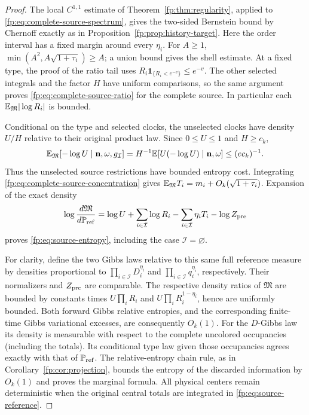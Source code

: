 \begin{proof}
The local $C^{1,1}$ estimate of Theorem~\ref{fp:thm:regularity},
applied to \eqref{fp:eq:complete-source-spectrum}, gives the
two-sided Bernstein bound by Chernoff exactly as in
Proposition~\ref{fp:prop:history-target}. Here the order interval
has a fixed margin around every $\eta_i$. For $A\ge1$,
$\min(A^2,A\sqrt{1+\tau_i})\ge A$; a union bound gives the shell
estimate. At a fixed type, the proof of the ratio tail uses
$R_i\mathbf1_{\{R_i<e^{-v}\}}\le e^{-v}$. The other selected
integrals and the factor $H$ have uniform comparisons, so the same
argument proves \eqref{fp:eq:complete-source-ratio} for the
complete source. In particular each $\mathbb E_{\mathfrak M}|\log R_i|$
is bounded.

Conditional on the type and selected clocks, the unselected clocks
have density $U/H$ relative to their original product law. Since
$0\le U\le1$ and $H\ge c_k$,
\[
 \mathbb E_{\mathfrak M}[-\log U\mid\mathbf n,\omega,g_{\mathcal I}]
     =H^{-1}\mathbb E[U(-\log U)\mid\mathbf n,\omega]
     \le (e c_k)^{-1}.
\]
Thus the unselected source restrictions have bounded entropy cost.
Integrating \eqref{fp:eq:complete-source-concentration} gives
$\mathbb E_{\mathfrak M}T_i=m_i+O_k(\sqrt{1+\tau_i})$.
Expansion of the exact density
\[
 \log\frac{d\mathfrak M}{d\mathbb P_{\rm ref}}
  =\log U+\sum_{i\in\mathcal I}\log R_i
       -\sum_{i\in\mathcal I}\eta_iT_i-\log Z_{\rm pre}
\]
proves \eqref{fp:eq:source-entropy}, including the case
$\mathcal I=\varnothing$.

For clarity, define the two Gibbs laws relative to this same full
reference measure by densities proportional to
$\prod_{i\in\mathcal I}D_i^{\eta_i}$ and
$\prod_{i\in\mathcal I}q_i^{\eta_i}$, respectively. Their
normalizers and $Z_{\rm pre}$ are comparable. The respective
density ratios of $\mathfrak M$ are bounded by constants times
$U\prod_iR_i$ and $U\prod_iR_i^{1-\eta_i}$, hence are uniformly
bounded. Both forward Gibbs relative entropies, and the corresponding
finite-time Gibbs variational excesses, are consequently $O_k(1)$.
For the $D$-Gibbs law its density is measurable with respect to the
complete uncolored occupancies (including the totals). Its conditional
type law given those occupancies agrees exactly with that of
$\mathbb P_{\rm ref}$. The relative-entropy chain rule, as in
Corollary~\ref{fp:cor:projection}, bounds the entropy of the
discarded information by $O_k(1)$ and proves the marginal formula.
All physical centers remain deterministic when the original central
totals are integrated in \eqref{fp:eq:source-reference}.
\end{proof}

